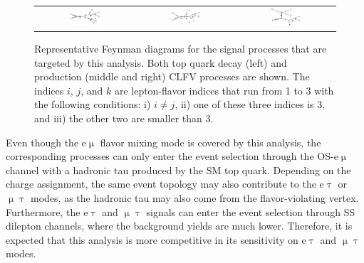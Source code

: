  \begin{figure}[tbh!]
 \begin{center}
 \begin{tabular}{ccc}
 \includegraphics[width=0.33\textwidth]{figures/Part4/Signal/TT}&
 \includegraphics[width=0.33\textwidth]{figures/Part4/Signal/ST1}&
 \includegraphics[width=0.33\textwidth]{figures/Part4/Signal/ST2}\\
 \end{tabular}
 \caption{Representative Feynman diagrams for the signal processes that are targeted by this analysis. Both top quark decay (left) and production (middle and right) \ac{CLFV} processes are shown. The indices $i$, $j$, and $k$ are lepton-flavor indices that run from 1 to 3 with the following conditions: i) $i\neq j$, ii) one of these three indices is 3, and iii) the other two are smaller than 3.}
 \label{fig:Target}
 \end{center}
 \end{figure}

Even though the e$\upmu$ flavor mixing mode is covered by this analysis, the corresponding processes can only enter the event selection through the \ac{OS}-e$\upmu$ channel with a hadronic tau produced by the \ac{SM} top quark. Depending on the charge assignment, the same event topology may also contribute to the e$\uptau$ or $\upmu\uptau$ modes, as the hadronic tau may also come from the flavor-violating vertex. Furthermore, the e$\uptau$ and $\upmu\uptau$ signals can enter the event selection through \ac{SS} dilepton channels, where the background yields are much lower. Therefore, it is expected that this analysis is more competitive in its sensitivity on e$\uptau$ and $\upmu\uptau$ modes.
